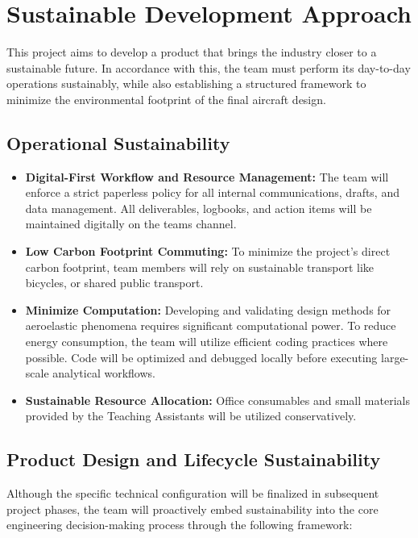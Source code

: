 \chapter{Sustainable Development Approach}
This project aims to develop a product that brings the industry closer to a sustainable future. In accordance with this, the team must perform its day-to-day operations sustainably, while also establishing a structured framework to minimize the environmental footprint of the final aircraft design.

\section{Operational Sustainability}

\begin{itemize}[leftmargin=*]
    \item \textbf{Digital-First Workflow and Resource Management:} The team will enforce a strict paperless policy for all internal communications, drafts, and data management. All deliverables, logbooks, and action items will be maintained digitally on the teams channel.
    
    \item \textbf{Low Carbon Footprint Commuting:} To minimize the project's direct carbon footprint, team members will rely on sustainable transport like bicycles, or shared public transport.

    \item \textbf{Minimize Computation:} Developing and validating design methods for aeroelastic phenomena requires significant computational power. To reduce energy consumption, the team will utilize efficient coding practices where possible. Code will be optimized and debugged locally before executing large-scale analytical workflows.
    
    \item \textbf{Sustainable Resource Allocation:} Office consumables and small materials provided by the Teaching Assistants will be utilized conservatively.
\end{itemize}

\section{Product Design and Lifecycle Sustainability}

Although the specific technical configuration will be finalized in subsequent project phases, the team will proactively embed sustainability into the core engineering decision-making process through the following framework:


